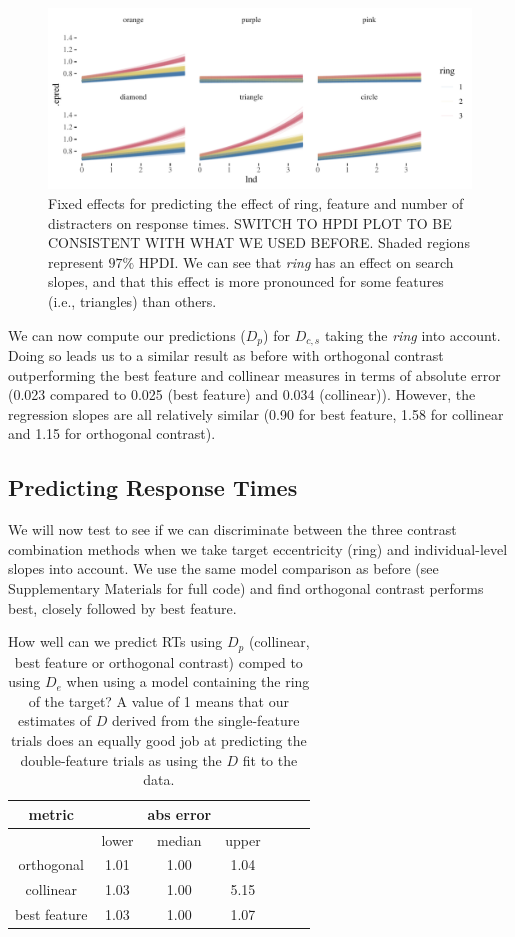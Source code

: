 \documentclass[preprint,12pt,authoryear]{elsarticle}
\begin{document}
\begin{figure}[ht]
\centering
\includegraphics[width=\textwidth]{../plots/ring_single_feature.pdf}
\caption{Fixed effects for predicting the effect of ring, feature and number of distracters on response times. SWITCH TO HPDI PLOT TO BE CONSISTENT WITH WHAT WE USED BEFORE. Shaded regions represent $97\%$ HPDI. We can see that \textit{ring} has an effect on search slopes, and that this effect is more pronounced for some features (i.e., triangles) than others.}
\label{fig:ring1}
\end{figure}

We can now compute our predictions ($D_p$) for $D_{c,s}$ taking the \textit{ring} into account. Doing so leads us to a similar result as before with orthogonal contrast outperforming the best feature and collinear measures in terms of absolute error (0.023 compared to 0.025 (best feature) and 0.034 (collinear)). However, the regression slopes are all relatively similar (0.90 for best feature, 1.58 for collinear and 1.15 for orthogonal contrast).

\subsection{Predicting Response Times}

We will now test to see if we can discriminate between the three contrast combination methods when we take target eccentricity (ring) and individual-level slopes into account. We use the same model comparison as before (see Supplementary Materials for full code) and find orthogonal contrast performs best, closely followed by best feature. 

\begin{table}[h]
\centering
\begin{tabular}{c|ccc|ccc} 
\hline
metric & & abs error & &   \\
 \hline
  & lower  & median & upper \\
 
orthogonal & 1.01 & 1.00 & 1.04 \\
collinear & 1.03 & 1.00 & 5.15\\ 
best feature  & 1.03 & 1.00 & 1.07 \\
 \end{tabular}
\caption{How well can we predict RTs using $D_p$ (collinear, best feature or orthogonal contrast) comped to using $D_e$ when using a model containing the ring of the target? A value of 1 means that our estimates of $D$ derived from the single-feature trials does an equally good job at predicting the double-feature trials as using the $D$ fit to the data.}
\label{tab:new_pred_rt_ring}
\end{table}
\end{document}
